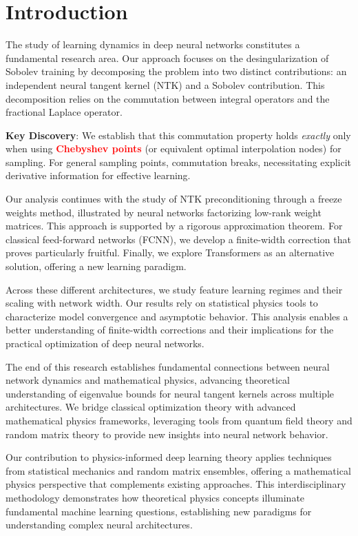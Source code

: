 \documentclass[a4paper]{article}
\theoremstyle{plain}
\theoremstyle{definition}
\theoremstyle{remark}
\begin{document}
\section*{Introduction}
The study of learning dynamics in deep neural networks constitutes a fundamental research area. Our approach focuses on the desingularization of Sobolev training by decomposing the problem into two distinct contributions: an independent neural tangent kernel (NTK) and a Sobolev contribution. This decomposition relies on the commutation between integral operators and the fractional Laplace operator.

\textbf{Key Discovery}: We establish that this commutation property holds \textit{exactly} only when using \textcolor{red}{\textbf{Chebyshev points}} (or equivalent optimal interpolation nodes) for sampling. For general sampling points, commutation breaks, necessitating explicit derivative information for effective learning. 

Our analysis continues with the study of NTK preconditioning through a freeze weights method, illustrated by neural networks factorizing low-rank weight matrices. This approach is supported by a rigorous approximation theorem. For classical feed-forward networks (FCNN), we develop a finite-width correction that proves particularly fruitful. Finally, we explore Transformers as an alternative solution, offering a new learning paradigm.

Across these different architectures, we study feature learning regimes and their scaling with network width. 
Our results rely on statistical physics tools to characterize model convergence and asymptotic behavior. 
This analysis enables a better understanding of finite-width corrections \cite{seleznova2022ntk_beyond} and their implications for the practical optimization of deep neural networks.

The end of this research establishes fundamental connections between neural network dynamics and mathematical physics, advancing theoretical understanding of eigenvalue bounds for neural tangent kernels across multiple architectures. We bridge classical optimization theory with advanced mathematical physics frameworks, leveraging tools from quantum field theory and random matrix theory to provide new insights into neural network behavior.

Our contribution to physics-informed deep learning theory applies techniques from statistical mechanics and random matrix ensembles, offering a mathematical physics perspective that complements existing approaches. This interdisciplinary methodology demonstrates how theoretical physics concepts illuminate fundamental machine learning questions, establishing new paradigms for understanding complex neural architectures.
\end{document}
